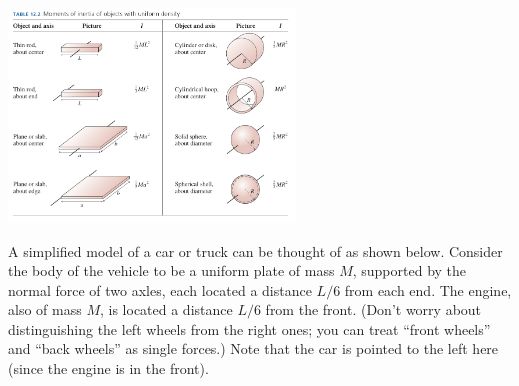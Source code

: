 \documentclass[12pt]{article}
\begin{document}
\begin{center}
	\includegraphics[width=3in]{moment-table.png}
\end{center}
%
%
%
%
%
%
%
%
%
%
%
%
%
%


A simplified model of a car or truck can be thought of as shown below. Consider
the body of the vehicle to be a uniform plate of mass $M$, supported by the
normal force of two axles, each located a distance $L/6$ from each end.
The engine, also of mass $M$, is located a distance $L/6$ from the front. (Don't worry about 
distinguishing the left wheels from the right ones; you can treat ``front wheels'' and ``back wheels''
as single forces.) Note that the car is pointed to the left here (since the engine is in the front).
\end{document}
